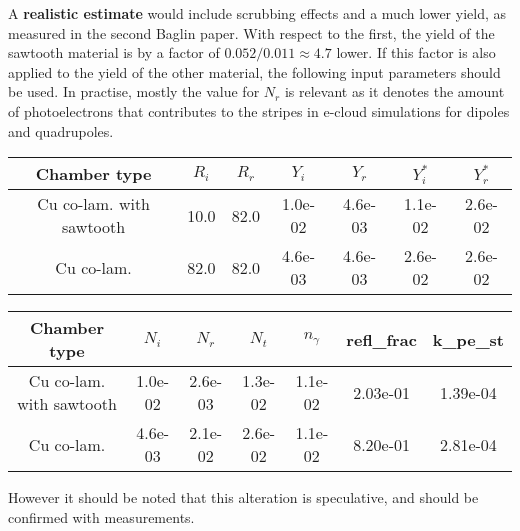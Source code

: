 A \textbf{realistic estimate} would include scrubbing effects and a much lower yield, as measured in the second Baglin paper.
With respect to the first, the yield of the sawtooth material is by a factor of $0.052/0.011 \approx 4.7$ lower.
If this factor is also applied to the yield of the other material, the following input parameters should be used.
In practise, mostly the value for $N_r$ is relevant as it denotes the amount of photoelectrons that contributes to the stripes in e-cloud simulations for dipoles and quadrupoles.

\begin{tabular}{c|cccc|cc}
Chamber type & $R_i$ & $R_r$ & $Y_i$ & $Y_r$ & $Y_i^*$ & $Y_r^*$  \\ \hline 
Cu co-lam. with sawtooth& 10.0 &82.0 &1.0e-02 &4.6e-03& 1.1e-02 &2.6e-02 \\
Cu co-lam.& 82.0 &82.0 &4.6e-03 &4.6e-03& 2.6e-02 &2.6e-02 \\
\end{tabular}

\begin{tabular}{c|ccc|c|cc}
Chamber type & $N_i$ & $N_r$ & $N_t$ & $n_\gamma$ & refl\_frac & k\_pe\_st \\ \hline 
Cu co-lam. with sawtooth& 1.0e-02 &2.6e-03 &1.3e-02 &1.1e-02 &2.03e-01 &1.39e-04\\
Cu co-lam.& 4.6e-03 &2.1e-02 &2.6e-02 &1.1e-02 &8.20e-01 &2.81e-04\\
\end{tabular}

However it should be noted that this alteration is speculative, and should be confirmed with measurements.





